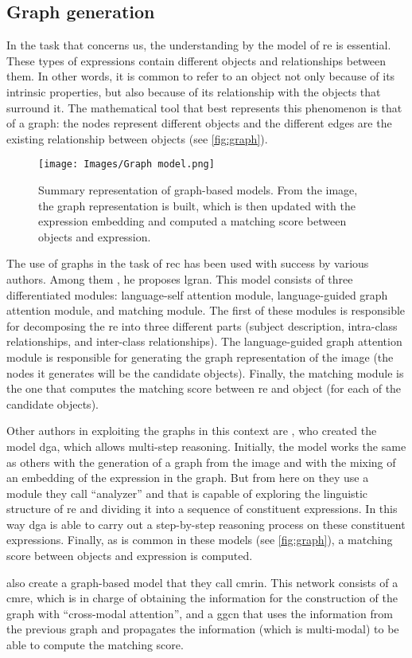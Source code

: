 \subsection{Graph generation}\label{sec:graph}
In the task that concerns us, the understanding by the model of \gls{re} is
essential. These types of expressions contain different objects and
relationships between them. In other words, it is common to refer to an object
not only because of its intrinsic properties, but also because of its
relationship with the objects that surround it. The mathematical tool that best
represents this phenomenon is that of a graph: the nodes represent different
objects and the different edges are the existing relationship between objects
(see \vref{fig:graph}).

\begin{figure}[htb]
  \centering
  \texttt{[image: Images/Graph model.png]}
  \caption[Graph based model representation]{Summary representation of
    graph-based models. From the image, the graph representation is built,
    which is then updated with the expression embedding and computed a matching
    score between objects and expression.}
  \label{fig:graph}
\end{figure}

The use of graphs in the task of \gls{rec} has been used with success by
various authors. Among them , he proposes
\gls{lgran}. This model consists of three differentiated modules: language-self
attention module, language-guided graph attention module, and matching
module. The first of these modules is responsible for decomposing the \gls{re}
into three different parts (subject description, intra-class relationships, and
inter-class relationships). The language-guided graph attention module is
responsible for generating the graph representation of the image (the nodes it
generates will be the candidate objects). Finally, the matching module is the
one that computes the matching score between \gls{re} and object (for each of
the candidate objects).

Other authors in exploiting the graphs in this context are
, who created the model \gls{dga}, which allows multi-step
reasoning. Initially, the model works the same as others with the generation of
a graph from the image and with the mixing of an embedding of the expression in
the graph. But from here on they use a module they call ``analyzer'' and that
is capable of exploring the linguistic structure of \gls{re} and dividing it
into a sequence of constituent expressions. In this way \gls{dga} is able to
carry out a step-by-step reasoning process on these constituent
expressions. Finally, as is common in these models (see \vref{fig:graph}), a
matching score between objects and expression is computed.

 also create a
graph-based model that they call \gls{cmrin}. This network consists of a
\gls{cmre}, which is in charge of obtaining the information for the
construction of the graph with ``cross-modal attention'', and a \gls{ggcn} that
uses the information from the previous graph and propagates the information
(which is multi-modal) to be able to compute the matching score.
